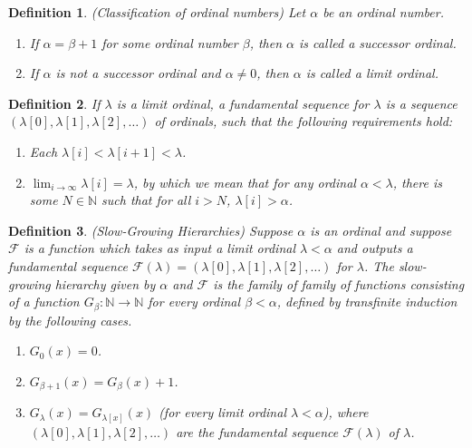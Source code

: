 \documentclass{article}
\newtheorem{definition}{Definition}
\begin{document}
\begin{definition}
    (Classification of ordinal numbers)
    Let $\alpha$ be an ordinal number.
    \begin{enumerate}
        \item
        If $\alpha=\beta+1$ for some ordinal number $\beta$, then $\alpha$ is called
        a \emph{successor ordinal}.
        \item
        If $\alpha$ is not a successor ordinal and $\alpha\neq 0$, then $\alpha$ is
        called a \emph{limit ordinal}.
    \end{enumerate}
\end{definition}

\begin{definition}
\label{fundamentalsequencedefn}
    If $\lambda$ is a limit ordinal, a \emph{fundamental sequence} for $\lambda$
    is a sequence $(\lambda[0],\lambda[1],\lambda[2],\ldots)$
    of ordinals, such that the following requirements hold:
    \begin{enumerate}
        \item
        Each $\lambda[i]<\lambda[i+1]<\lambda$.
        \item
        $\lim_{i\to\infty}\lambda[i]=\lambda$, by which we mean that for
        any ordinal $\alpha<\lambda$, there is some $N\in\mathbb N$ such that
        for all $i>N$, $\lambda[i]>\alpha$.
    \end{enumerate}
\end{definition}

\begin{definition}
\label{slowgrowinghierarchiesdefn}
    (Slow-Growing Hierarchies)
    Suppose $\alpha$ is an ordinal and suppose $\mathcal F$ is a function which
    takes as input a limit ordinal $\lambda<\alpha$ and outputs a fundamental
    sequence $\mathcal F(\lambda)=(\lambda[0],\lambda[1],\lambda[2],\ldots)$
    for $\lambda$. The \emph{slow-growing hierarchy given by $\alpha$ and $\mathcal F$}
    is the family of family of functions consisting of a function
    $G_\beta:\mathbb N\to\mathbb N$ for every
    ordinal $\beta<\alpha$, defined by transfinite induction by the following cases.
    \begin{enumerate}
        \item
        $G_0(x)=0$.
        \item
        $G_{\beta+1}(x) = G_\beta(x) + 1$.
        \item
        $G_{\lambda}(x) = G_{\lambda[x]}(x)$ (for every limit ordinal $\lambda<\alpha$),
        where $(\lambda[0],\lambda[1],\lambda[2],\ldots)$ are the fundamental sequence
        $\mathcal F(\lambda)$ of $\lambda$.
    \end{enumerate}
\end{definition}
\end{document}
